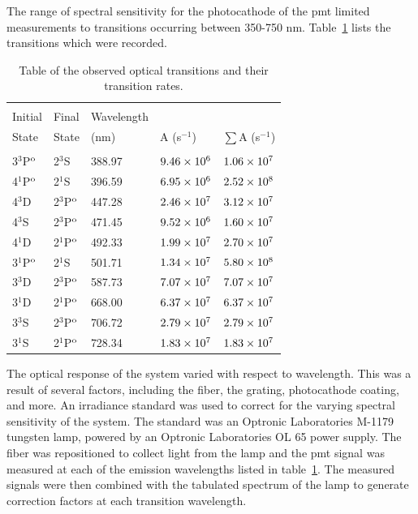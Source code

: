 The range of spectral sensitivity for the photocathode of the \acs{pmt} limited
measurements to transitions occurring between 350-750 nm.
Table~\ref{tbl:transitions} lists the transitions which were recorded.
\begin{table}
  \centering
  \caption{Table of the observed optical transitions and their transition
    rates.}
  \begin{tabular}{lllll}
    \toprule                                                                    \\
    Initial      & Final        & Wavelength &              &                   \\
    State        & State        & (nm)       & A (s$^{-1}$) & $\sum$A (s$^{-1}$)\\
    \midrule                                                                    \\
    3$^3$P$^\mathrm{o}$ & 2$^3$S       & 388.97     & $9.46\times10^6$   & $1.06\times10^7$        \\
    4$^1$P$^\mathrm{o}$ & 2$^1$S       & 396.59     & $6.95\times10^6$   & $2.52\times10^8$        \\
    4$^3$D       & 2$^3$P$^\mathrm{o}$ & 447.28     & $2.46\times10^7$   & $3.12\times10^7$        \\
    4$^3$S       & 2$^3$P$^\mathrm{o}$ & 471.45     & $9.52\times10^6$   & $1.60\times10^7$        \\
    4$^1$D       & 2$^1$P$^\mathrm{o}$ & 492.33     & $1.99\times10^7$   & $2.70\times10^7$        \\
    3$^1$P$^\mathrm{o}$ & 2$^1$S       & 501.71     & $1.34\times10^7$   & $5.80\times10^8$        \\
    3$^3$D       & 2$^3$P$^\mathrm{o}$ & 587.73     & $7.07\times10^7$   & $7.07\times10^7$        \\
    3$^1$D       & 2$^1$P$^\mathrm{o}$ & 668.00     & $6.37\times10^7$   & $6.37\times10^7$        \\
    3$^3$S       & 2$^3$P$^\mathrm{o}$ & 706.72     & $2.79\times10^7$   & $2.79\times10^7$        \\
    3$^1$S       & 2$^1$P$^\mathrm{o}$ & 728.34     & $1.83\times10^7$   & $1.83\times10^7$        \\
  \end{tabular}
  \label{tbl:transitions}
\end{table}
The optical response of the system varied with respect to wavelength. This was a
result of several factors, including the fiber, the grating, photocathode
coating, and more. An irradiance standard was used to correct for the varying
spectral sensitivity of the system. The standard was an Optronic Laboratories
M-1179 tungsten lamp, powered by an Optronic Laboratories OL 65 power supply.
The fiber was repositioned to collect light from the lamp and the \acs{pmt}
signal was measured at each of the emission wavelengths listed in
table~\ref{tbl:transitions}. The measured signals were then combined with the
tabulated spectrum of the lamp to generate correction factors at each transition
wavelength.

